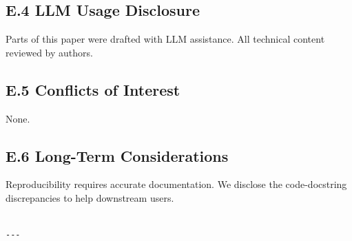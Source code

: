 \subsection{E.4 LLM Usage Disclosure}

Parts of this paper were drafted with LLM assistance. All technical content 
reviewed by authors.

\subsection{E.5 Conflicts of Interest}

None.

\subsection{E.6 Long-Term Considerations}

Reproducibility requires accurate documentation. We disclose the 
code-docstring discrepancies to help downstream users.
\begin{lstlisting}

---
\end{lstlisting}